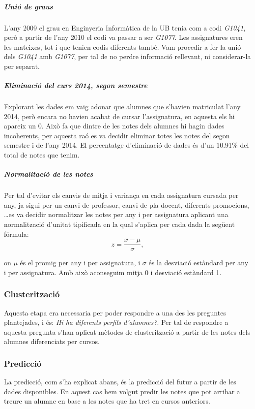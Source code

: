 \documentclass[12pt,a4paper,catalan]{article}
\begin{document}
\subparagraph{Unió de graus}
L'any 2009 el grau en Enginyeria Informàtica de la UB tenia com a codi \textit{G1041}, però a partir de l'any 2010 el codi va passar a ser \textit{G1077}. Les assignatures eren les mateixes, tot i que tenien codis diferents també. Vam procedir a fer la unió dels \textit{G1041} amb \textit{G1077}, per tal de no perdre informació rellevant, ni considerar-la per separat.

\subparagraph{Eliminació del curs 2014, segon semestre}
Explorant les dades em vaig adonar que alumnes que s'havien matriculat l'any 2014, però encara no havien acabat de cursar l'assignatura, en aquesta els hi apareix un 0. Això fa que dintre de les notes dels alumnes hi hagin dades incoherents, per aquesta raó es va decidir eliminar totes les notes del segon semestre i de l'any 2014. El percentatge d'eliminació de dades és d'un 10.91\% del total de notes que tenim.

\subparagraph{Normalitació de les notes}
Per tal d'evitar els canvis de mitja i variança en cada assignatura cursada per any, ja sigui per un canvi de professor, canvi de pla docent, diferents promocions, \ldots es va decidir normalitzar les notes per any i per assignatura aplicant una normalització d'unitat tipificada \cite{normtipificada} en la qual s'aplica per cada dada la següent fórmula:
$$ z = \frac{x - \mu}{\sigma}, $$

on $\mu$ és el promig per any i per assignatura, i $\sigma$ és la desviació estàndard per any i per assignatura. Amb això aconseguim mitja 0 i desviació estàndard 1.

\subsubsection{Clusterització}
Aquesta etapa era necessaria per poder respondre a una des les preguntes plantejades, i és: \textit{Hi ha diferents perfils d'alumnes?}. Per tal de  respondre a aquesta pregunta s'han aplicat mètodes de clusterització a partir de les notes dels alumnes diferenciats per cursos.

\subsubsection{Predicció}
La predicció, com s'ha explicat abans, és la predicció del futur a partir de les dades disponibles. En aquest cas hem volgut predir les notes que pot arribar a treure un alumne en base a les notes que ha tret en cursos anteriors.
\end{document}
